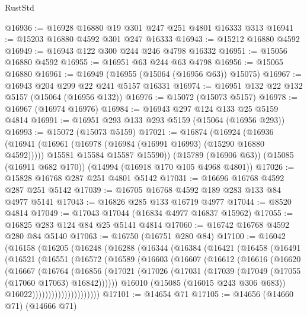 \begin{lexlean}{RustStd}
\begin{coremodule}
@16936 := @16928 @16880 @19 @301 @247 @251 @4801 @16333 @313
@16941 := @15203 @16880 @4592 @301 @247 @16333
@16943 := @15212 @16880 @4592
@16949 := @16943 @122 @300 @244 @246 @4798 @16332
@16951 := @15056 @16880 @4592
@16955 := @16951 @63 @244 @63 @4798
@16956 := @15065 @16880
@16961 := @16949 (@16955 (@15064 (@16956 @63)) @15075)
@16967 := @16943 @204 @299 @22 @241 @5157 @16331
@16974 := @16951 @132 @22 @132 @5157 (@15064 (@16956 @132))
@16976 := @15072 (@15073 @5157)
@16978 := @16967 (@16974 @16976)
@16984 := @16943 @297 @124 @133 @25 @5159 @4814
@16991 := @16951 @293 @133 @293 @5159 (@15064 (@16956 @293))
@16993 := @15072 (@15073 @5159)
@17021 := @16874
    (@16924
      (@16936
        (@16941 (@16961 (@16978 (@16984 (@16991 @16993) (@15290 @16880 @4592)))))
        @15581
        @15584
        @15587
        @15590))
    (@15789 (@16906 @63))
    (@15085 (@16911 @682 @170))
    (@14994 (@16918 @170 @105 @4968 @4801))
@17026 := @15828 @16768 @287 @251 @4801 @5142
@17031 := @16696 @16768 @4592 @287 @251 @5142
@17039 := @16705 @16768 @4592 @189 @283 @133 @84 @4977 @5141
@17043 := @16826 @285 @133 @16719 @4977
@17044 := @8520 @4814
@17049 := @17043 @17044 (@16834 @4977 @16837 @15962)
@17055 := @16825 @283 @124 @84 @25 @5141 @4814
@17060 := @16742 @16768 @4592 @280 @84 @5140
@17063 := @16750 (@16751 @280 @84)
@17100 := @16042
    (@16158
      (@16205
        (@16248
          (@16288
            (@16344
              (@16384
                (@16421
                  (@16458
                    (@16491
                      (@16521
                        (@16551
                          (@16572
                            (@16589
                              (@16603
                                (@16607
                                  (@16612
                                    (@16616
                                      (@16620
                                        (@16667
                                          (@16764
                                            (@16856
                                              (@17021
                                                (@17026
                                                  (@17031
                                                    (@17039
                                                      (@17049 (@17055 (@17060 @17063) @16842))))))
                                              @16010
                                              (@15085 (@16015 @243 @306 @683))
                                              @16022)))))))))))))))))))))
@17101 := @14654 @71
@17105 := @14656 (@14660 @71) (@14666 @71)

\end{coremodule}
\end{lexlean}
